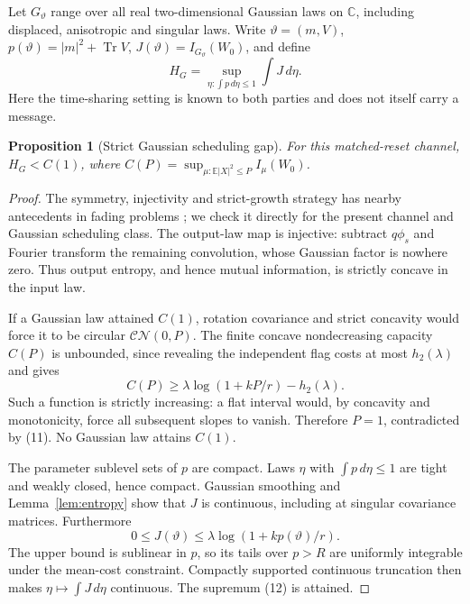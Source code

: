 \documentclass[11pt]{article}
\newtheorem{proposition}[theorem]{Proposition}
\newcommand{\C}{\mathbb C}
\newcommand{\E}{\mathbb E}
\newcommand{\Tr}{\operatorname{Tr}}
\newcommand{\CN}{\mathcal{CN}}
\begin{document}
Let \(G_\vartheta\) range over all real two-dimensional Gaussian laws
on \(\C\), including displaced, anisotropic and singular laws.
Write \(\vartheta=(m,V)\), \(p(\vartheta)=|m|^2+\Tr V\),
\(J(\vartheta)=I_{G_\vartheta}(W_0)\), and define
\[
 H_G=\sup_{\eta:\int p\,d\eta\leq1}\int J\,d\eta .           \tag{12}
\]
Here the time-sharing setting is known to both parties and does not
itself carry a message.

\begin{proposition}[Strict Gaussian scheduling gap]\label{prop:hull}
For this matched-reset channel, \(H_G<C(1)\), where
\(C(P)=\sup_{\mu:\E|X|^2\leq P}I_\mu(W_0)\).
\end{proposition}
\begin{proof}
The symmetry, injectivity and strict-growth strategy has nearby
antecedents in fading problems \cite{catalano,tu}; we check it directly
for the present channel and Gaussian scheduling class.
The output-law map is injective: subtract \(q\phi_s\) and Fourier
transform the remaining convolution, whose Gaussian factor is nowhere
zero. Thus output entropy, and hence mutual information, is strictly
concave in the input law.

If a Gaussian law attained \(C(1)\), rotation covariance and strict
concavity would force it to be circular \(\CN(0,P)\).
The finite concave nondecreasing capacity \(C(P)\) is unbounded, since
revealing the independent flag costs at most \(h_2(\lambda)\) and gives
\[
 C(P)\geq\lambda\log(1+kP/r)-h_2(\lambda).
\]
Such a function is strictly increasing: a flat interval would, by
concavity and monotonicity, force all subsequent slopes to vanish.
Therefore \(P=1\), contradicted by (11). No Gaussian law attains \(C(1)\).

The parameter sublevel sets of \(p\) are compact. Laws \(\eta\) with
\(\int p\,d\eta\leq1\) are tight and weakly closed, hence compact.
Gaussian smoothing and Lemma~\ref{lem:entropy} show that \(J\) is continuous,
including at singular covariance matrices. Furthermore
\[
 0\leq J(\vartheta)\leq\lambda\log(1+kp(\vartheta)/r).
\]
The upper bound is sublinear in \(p\), so its tails over \(p>R\)
are uniformly integrable under the mean-cost constraint.
Compactly supported continuous truncation then makes
\(\eta\mapsto\int J\,d\eta\) continuous. The supremum (12) is attained.


\end{proof}
\end{document}
